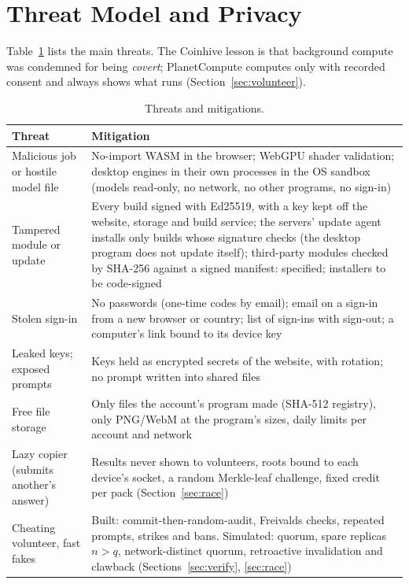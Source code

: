 \documentclass[11pt,a4paper]{article}
\theoremstyle{definition}
\theoremstyle{plain}
\begin{document}
\section{Threat Model and Privacy}\label{sec:threat}

Table~\ref{tab:threats} lists the main threats. The Coinhive lesson
\citep{eskandari2018cryptojacking,konoth2018minesweeper} is that background compute was condemned for being
\emph{covert}; PlanetCompute computes only with recorded consent and always shows what runs (Section~\ref{sec:volunteer}).

\begin{table}[ht]
\centering
\caption{Threats and mitigations.}\label{tab:threats}
\small
\begin{tabularx}{\linewidth}{@{}>{\raggedright\arraybackslash}p{3.6cm}X@{}}
\toprule
\textbf{Threat} & \textbf{Mitigation} \\
\midrule
Malicious job or hostile model file & No-import WASM in the browser; WebGPU shader validation; desktop engines in their own processes in the OS sandbox (models read-only, no network, no other programs, no sign-in) \\
Tampered module or update          & Every build signed with Ed25519, with a key kept off the website, storage and build service; the servers' update agent installs only builds whose signature checks (the desktop program does not update itself); third-party modules checked by SHA-256 against a signed manifest: specified; installers to be code-signed \\
Stolen sign-in                     & No passwords (one-time codes by email); email on a sign-in from a new browser or country; list of sign-ins with sign-out; a computer's link bound to its device key \\
Leaked keys; exposed prompts       & Keys held as encrypted secrets of the website, with rotation; no prompt written into shared files \\
Free file storage                  & Only files the account's program made (SHA-512 registry), only PNG/WebM at the program's sizes, daily limits per account and network \\
Lazy copier (submits another's answer) & Results never shown to volunteers, roots bound to each device's socket, a random Merkle-leaf challenge, fixed credit per pack (Section~\ref{sec:race}) \\
Cheating volunteer, fast fakes     & Built: commit-then-random-audit, Freivalds checks, repeated prompts, strikes and bans. Simulated: quorum, spare replicas $n>q$, network-distinct quorum, retroactive invalidation and clawback (Sections~\ref{sec:verify}, \ref{sec:race}) \\

\end{tabularx}
\end{table}
\end{document}
